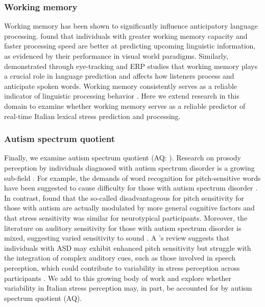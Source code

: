 \subsubsection{Working memory}
Working memory has been shown to significantly influence anticipatory language processing. \cite{Huettig2016} found that individuals with greater working memory capacity and faster processing speed are better at predicting upcoming linguistic information, as evidenced by their performance in visual world paradigms. Similarly, \cite{Li2023} demonstrated through eye-tracking and ERP studies that working memory plays a crucial role in language prediction and affects how listeners process and anticipate spoken words. Working memory consistently serves as a reliable indicator of linguistic processing behavior \citep{mchaney_et_al_2021_workingmemory, goss_2014, hadar_2016}. Here we extend research in this domain to examine whether working memory serves as a reliable predictor of real-time Italian lexical stress prediction and processing.


\subsubsection{Autism spectrum quotient}
Finally, we examine autism spectrum quotient (AQ: \cite{Baron-Cohen2001}). Research on prosody perception by individuals diagnosed with autism spectrum disorder is a growing sub-field \citep[see ][]{Grice2023, Paul2005, McCann2003}. For example, the demands of word recognition for pitch-sensitive words have been suggested to cause difficulty for those with autism spectrum disorder \citep{schelinski2020speech}. In contrast, \cite{grossman2023relationship} found that the so-called disadvantageous for pitch sensitivity for those with autism are actually modulated by more general cognitive factors and that stress sensitivity was similar for neurotypical participants. Moreover, the literature on auditory sensitivity for those with autism spectrum disorder is mixed, suggesting varied sensitivity to sound \citep{Kuiper2019, Stiegler2010}. A \cite{Haesen2011}'s review suggests that individuals with ASD may exhibit enhanced pitch sensitivity but struggle with the integration of complex auditory cues, such as those involved in speech perception, which could contribute to variability in stress perception across participants . We add to this growing body of work and explore whether variability in Italian stress perception may, in part, be accounted for by autism spectrum quotient (AQ). 

